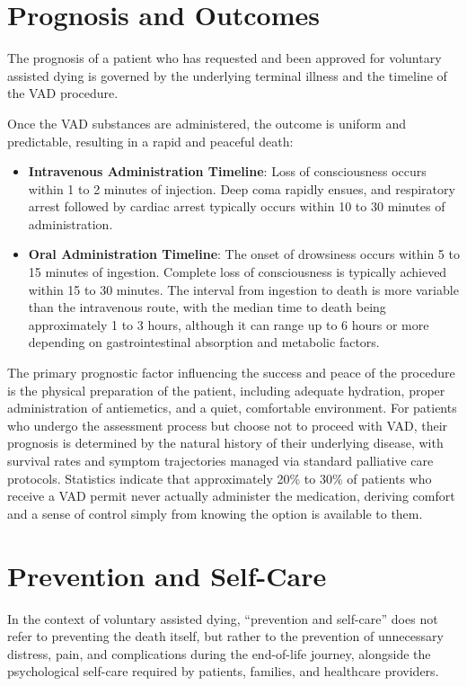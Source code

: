 \section*{Prognosis and Outcomes}
The prognosis of a patient who has requested and been approved for voluntary assisted dying is governed by the underlying terminal illness and the timeline of the VAD procedure.

Once the VAD substances are administered, the outcome is uniform and predictable, resulting in a rapid and peaceful death:
\begin{itemize}
    \item \textbf{Intravenous Administration Timeline}: Loss of consciousness occurs within 1 to 2 minutes of injection. Deep coma rapidly ensues, and respiratory arrest followed by cardiac arrest typically occurs within 10 to 30 minutes of administration.
    \item \textbf{Oral Administration Timeline}: The onset of drowsiness occurs within 5 to 15 minutes of ingestion. Complete loss of consciousness is typically achieved within 15 to 30 minutes. The interval from ingestion to death is more variable than the intravenous route, with the median time to death being approximately 1 to 3 hours, although it can range up to 6 hours or more depending on gastrointestinal absorption and metabolic factors.
\end{itemize}

The primary prognostic factor influencing the success and peace of the procedure is the physical preparation of the patient, including adequate hydration, proper administration of antiemetics, and a quiet, comfortable environment. For patients who undergo the assessment process but choose not to proceed with VAD, their prognosis is determined by the natural history of their underlying disease, with survival rates and symptom trajectories managed via standard palliative care protocols. Statistics indicate that approximately 20\% to 30\% of patients who receive a VAD permit never actually administer the medication, deriving comfort and a sense of control simply from knowing the option is available to them.

\section*{Prevention and Self-Care}
In the context of voluntary assisted dying, ``prevention and self-care'' does not refer to preventing the death itself, but rather to the prevention of unnecessary distress, pain, and complications during the end-of-life journey, alongside the psychological self-care required by patients, families, and healthcare providers.


